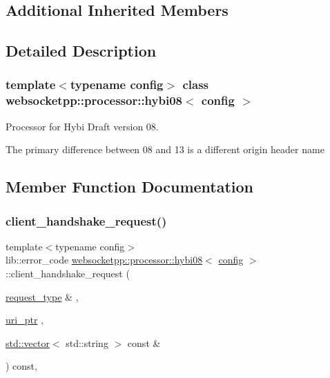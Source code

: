 \subsection*{Additional Inherited Members}


\subsection{Detailed Description}
\subsubsection*{template$<$typename config$>$\newline
class websocketpp\+::processor\+::hybi08$<$ config $>$}

Processor for Hybi Draft version 08. 

The primary difference between 08 and 13 is a different origin header name 

\subsection{Member Function Documentation}
\mbox{\label{classwebsocketpp_1_1processor_1_1hybi08_a9509cba08ab3a15ea2ff34276b2582cb}} 
\subsubsection{\texorpdfstring{client\+\_\+handshake\+\_\+request()}{client\_handshake\_request()}}
{\footnotesize\ttfamily template$<$typename config$>$ \\
lib\+::error\+\_\+code \mbox{\hyperlink{classwebsocketpp_1_1processor_1_1hybi08}{websocketpp\+::processor\+::hybi08}}$<$ \mbox{\hyperlink{classconfig}{config}} $>$\+::client\+\_\+handshake\+\_\+request (\begin{DoxyParamCaption}\item[{\mbox{\hyperlink{classwebsocketpp_1_1http_1_1parser_1_1request}{request\+\_\+type}} \&}]{,  }\item[{\mbox{\hyperlink{namespacewebsocketpp_aae370ea5ac83a8ece7712cb39fc23f5b}{uri\+\_\+ptr}}}]{,  }\item[{\mbox{\hyperlink{classstd_1_1vector}{std\+::vector}}$<$ std\+::string $>$ const \&}]{ }\end{DoxyParamCaption}) const\hspace{0.3cm}{\ttfamily [inline]}, {\ttfamily [virtual]}}



